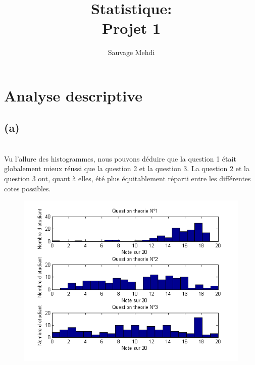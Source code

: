 \documentclass[10pt,a4paper]{article}
\title{Statistique: \\Projet 1}
\author{Sauvage Mehdi}
\begin{document}




\maketitle
\newpage
\section{Analyse descriptive}



\subsection*{(a)}
\ \\

Vu l'allure des histogrammes, nous pouvons déduire que la question 1 était globalement mieux réussi que la question 2 et la question 3. La question 2 et la question 3 ont, quant à elles, été plus équitablement réparti entre les différentes cotes possibles. 
\ \\

\begin{figure}[h]
\centering
\includegraphics[scale= 0.5]{1a_graphe.png}
\end{figure}
\end{document}
